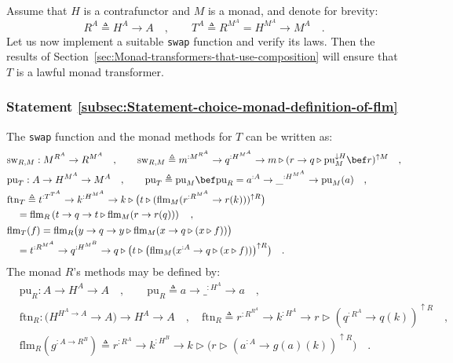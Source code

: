 Assume that $H$ is a contrafunctor and $M$ is a monad, and denote
for brevity:
\[
R^{A}\triangleq H^{A}\rightarrow A\quad,\quad\quad T^{A}\triangleq R^{M^{A}}=H^{M^{A}}\rightarrow M^{A}\quad.
\]
Let us now implement a suitable \lstinline!swap! function and verify
its laws. Then the results of Section~\ref{sec:Monad-transformers-that-use-composition}
will ensure that $T$ is a lawful monad transformer. 

\subsubsection{Statement \label{subsec:Statement-choice-monad-definition-of-flm}\ref{subsec:Statement-choice-monad-definition-of-flm}}

The \lstinline!swap! function and the monad methods for $T$ can
be written as:
\begin{align}
 & \text{sw}_{R,M}:M^{R^{A}}\rightarrow R^{M^{A}}\quad,\quad\quad\text{sw}_{R,M}\triangleq m^{:M^{R^{A}}}\rightarrow q^{:H^{M^{A}}}\rightarrow m\triangleright(r\rightarrow q\triangleright\text{pu}_{M}^{\downarrow H}\bef r)^{\uparrow M}\quad,\label{eq:rigid-monad-short-formula-for-swap}\\
 & \text{pu}_{T}:A\rightarrow H^{M^{A}}\rightarrow M^{A}\quad,\quad\quad\text{pu}_{T}\triangleq\text{pu}_{M}\bef\text{pu}_{R}=a^{:A}\rightarrow\_^{:H^{M^{A}}}\rightarrow\text{pu}_{M}(a)\quad,\nonumber \\
 & \text{ftn}_{T}\triangleq t^{:T^{T^{A}}}\rightarrow k^{:H^{M^{A}}}\rightarrow k\triangleright\big(t\triangleright(\text{flm}_{M}(r^{:R^{M^{A}}}\rightarrow r(k)))^{\uparrow R}\big)\nonumber \\
 & \quad=\text{flm}_{R}\left(t\rightarrow q\rightarrow t\triangleright\text{flm}_{M}(r\rightarrow r(q))\right)\quad,\\
 & \text{flm}_{T}(f)=\text{flm}_{R}\big(y\rightarrow q\rightarrow y\triangleright\text{flm}_{M}(x\rightarrow q\triangleright(x\triangleright f))\big)\label{eq:rigid-monad-def-flm-t-via-flm-r}\\
 & \quad=t^{:R^{M^{A}}}\rightarrow q^{:H^{M^{B}}}\rightarrow q\triangleright\big(t\triangleright\big(\text{flm}_{M}(x^{:A}\rightarrow q\triangleright(x\triangleright f))\big)^{\uparrow R}\big)\quad.\label{eq:rigid-monad-flm-T-def}
\end{align}
The monad $R$\textsf{'}s methods may be defined by:
\begin{align}
 & \text{pu}_{R}:A\rightarrow H^{A}\rightarrow A\quad,\quad\quad\text{pu}_{R}\triangleq a\rightarrow\_^{:H^{A}}\rightarrow a\quad,\nonumber \\
 & \text{ftn}_{R}:(H^{H^{A}\rightarrow A}\rightarrow A\big)\rightarrow H^{A}\rightarrow A\quad,\quad\text{ftn}_{R}\triangleq r^{:R^{R^{A}}}\rightarrow k^{:H^{A}}\rightarrow r\triangleright(q^{:R^{A}}\rightarrow q(k))^{\uparrow R}\quad,\nonumber \\
 & \text{flm}_{R}(g^{:A\rightarrow R^{B}})\triangleq r^{:R^{A}}\rightarrow k^{:H^{B}}\rightarrow k\triangleright\big(r\triangleright(a^{:A}\rightarrow g(a)(k))^{\uparrow R}\big)\quad.\label{eq:rigid-monad-flm-R-def}
\end{align}


